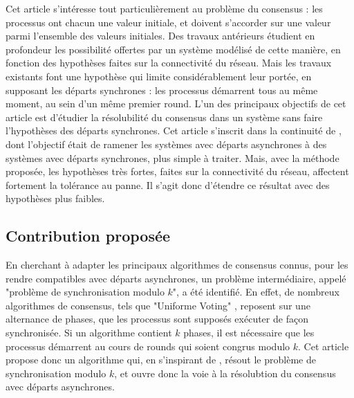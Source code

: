 \documentclass{article}
\begin{document}
Cet article s'intéresse tout particulièrement au problème du consensus : les processus ont chacun une valeur initiale, et doivent s'accorder sur une valeur parmi l'ensemble des valeurs initiales.
Des travaux antérieurs étudient en profondeur les possibilité offertes par un système modélisé de cette manière, en fonction des hypothèses faites sur la connectivité du réseau.
Mais les travaux existants font une hypothèse qui limite considérablement leur portée, en supposant les départs synchrones : les processus démarrent tous au même moment, au sein d'un même premier round.
L'un des principaux objectifs de cet article est d'étudier la résolubilité du consensus dans un système sans faire l'hypothèses des départs synchrones.
Cet article s'inscrit dans la continuité de \cite{firing_squad}, dont l'objectif était de ramener les systèmes avec départs asynchrones à des systèmes avec départs synchrones, plus simple à traiter.
Mais, avec la méthode proposée, les hypothèses très fortes, faites sur la connectivité du réseau, affectent fortement la tolérance au panne.
Il s'agit donc d'étendre ce résultat avec des hypothèses plus faibles.

\subsection{Contribution proposée}

En cherchant à adapter les principaux algorithmes de consensus connus,
pour les rendre compatibles avec départs asynchrones, un problème intermédiaire, appelé "problème de synchronisation modulo $k$", a été identifié.
En effet, de nombreux algorithmes de consensus, tels que "Uniforme Voting" \cite{model_ho}, reposent sur une alternance de phases, que les processus sont supposés exécuter de façon synchronisée.
Si un algorithme contient $k$ phases, il est nécessaire que les processus démarrent au cours de rounds qui soient congrus modulo $k$.
Cet article propose donc un algorithme qui, en s'inspirant de \cite{firing_squad},
résout le problème de synchronisation modulo $k$, et ouvre donc la voie à la résolubtion du consensus avec départs asynchrones.
\end{document}
